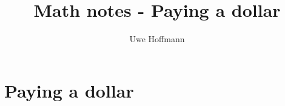 

\title{Math notes - Paying a dollar}
\author{Uwe Hoffmann}



\setcounter{chapter}{1}
\chapter*{Paying a dollar}

